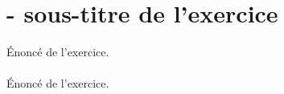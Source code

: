 \documentclass[12pt,a4paper]{nsieval}
\begin{document}
\maketitle


\section{- sous-titre de l'exercice}


Énoncé de l'exercice. \\

\\

Énoncé de l'exercice. \\
\end{document}

